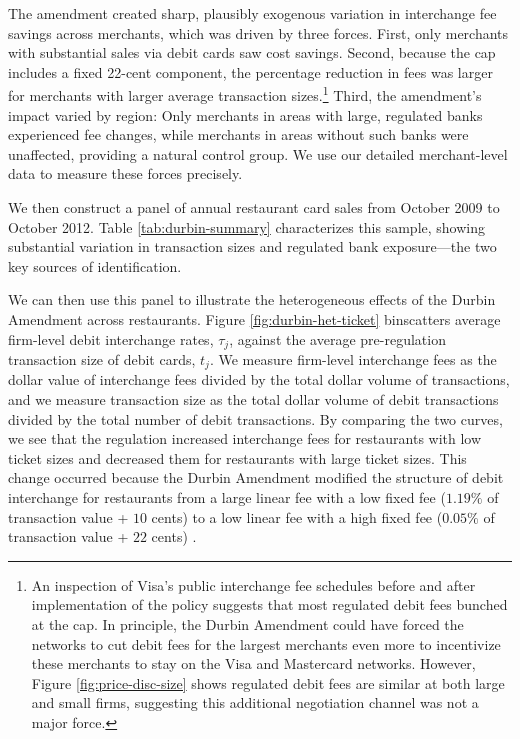 \documentclass[main.tex]{subfiles}
\begin{document}
The amendment created sharp, plausibly exogenous variation in interchange fee savings across merchants, which was driven by three forces.
First, only merchants with substantial sales via debit cards saw cost savings.
Second, because the cap includes a fixed 22-cent component, the percentage reduction in fees was larger for merchants with larger average transaction sizes.\footnote{ An inspection of Visa's public interchange fee schedules before and after implementation of the policy suggests that most regulated debit fees bunched at the cap.
In principle, the Durbin Amendment could have forced the networks to cut debit fees for the largest merchants even more to incentivize these merchants to stay on the Visa and Mastercard networks.
However, Figure \ref{fig:price-disc-size} shows regulated debit fees are similar at both large and small firms, suggesting this additional negotiation channel was not a major force. } Third, the amendment's impact varied by region: Only merchants in areas with large, regulated banks experienced fee changes, while merchants in areas without such banks were unaffected, providing a natural control group.
We use our detailed merchant-level data to measure these forces precisely.

We then construct a panel of annual restaurant card sales from October 2009 to October 2012.
Table \ref{tab:durbin-summary} characterizes this sample, showing substantial variation in transaction sizes and regulated bank exposure---the two key sources of identification.

We can then use this panel to illustrate the heterogeneous effects of the Durbin Amendment across restaurants.
Figure \ref{fig:durbin-het-ticket} binscatters average firm-level debit interchange rates, $\tau_j$, against the average pre-regulation transaction size of debit cards, $t_j$.
We measure firm-level interchange fees as the dollar value of interchange fees divided by the total dollar volume of transactions, and we measure transaction size as the total dollar volume of debit transactions divided by the total number of debit transactions.
By comparing the two curves, we see that the regulation increased interchange fees for restaurants with low ticket sizes and decreased them for restaurants with large ticket sizes.
This change occurred because the Durbin Amendment modified the structure of debit interchange for restaurants from a large linear fee with a low fixed fee ($1.19\%$ of transaction value + $10$ cents) to a low linear fee with a high fixed fee ($0.05\%$ of transaction value + $22$ cents) \citep{Visa2010}.
\end{document}
